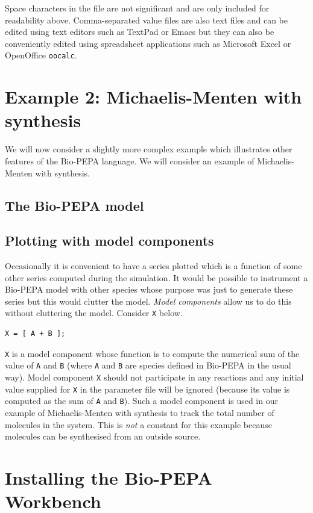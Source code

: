 \documentclass[11pt,a4paper]{article}
\newcommand{\BioPEPA}{Bio-PEPA}
\newcommand{\BPWB}{{\BioPEPA} Workbench}
\begin{document}
Space characters in the file are not significant and are only included
for readability above.  Comma-separated value files are also text
files and can be edited using text editors such as TextPad or Emacs
but they can also be conveniently edited using spreadsheet
applications such as Microsoft Excel or OpenOffice \texttt{oocalc}.


\section{Example 2: Michaelis-Menten with synthesis}

We will now consider a slightly more complex example which illustrates
other features of the Bio-PEPA language.  We will consider an example of
Michaelis-Menten with synthesis.

\subsection{The Bio-PEPA model}
 


\subsection{Plotting with model components}

Occasionally it is convenient to have a series plotted which is a
function of some other series computed during the simulation.  It
would be possible to instrument a Bio-PEPA model with other species
whose purpose was just to generate these series but this would clutter
the model.  \emph{Model components} allow us to do this without
cluttering the model.  Consider \texttt{X} below.
\begin{verbatim}
X = [ A + B ];
\end{verbatim}
\texttt{X} is a model component whose function is to compute the
numerical sum of the value of \texttt{A} and \texttt{B} (where
\texttt{A} and \texttt{B} are species defined in Bio-PEPA in the usual
way).  Model component \texttt{X} should not participate in any
reactions and any initial value supplied for \texttt{X} in the
parameter file will be ignored (because its value is computed as the
sum of \texttt{A} and \texttt{B}).  Such a model component is used in 
our example of Michaelis-Menten with synthesis to track the total number
of molecules in the system.  This is \emph{not} a constant for this 
example because molecules can be synthesised from an outside source.


\section{Installing the \BPWB}
\end{document}
